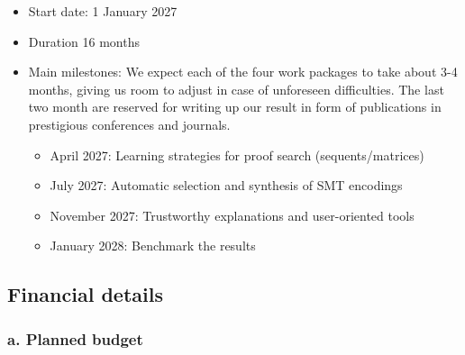 \documentclass[a4paper]{article}
\begin{document}
\begin{itemize}
    \item Start date: 1 January 2027
    \item Duration 16 months
    \item Main milestones: We expect each of the four work packages to take about 3-4 months, giving us room to adjust in case of unforeseen difficulties. The last two month are reserved for writing up our result in form of publications in prestigious conferences and journals.
    \begin{itemize}
        \item  April 2027: Learning strategies for proof search (sequents/matrices)
        \item July 2027: Automatic selection and synthesis of SMT encodings
        \item November 2027: Trustworthy explanations and user-oriented tools
        \item January 2028: Benchmark the results
    \end{itemize}
\end{itemize}


\subsection*{Financial details}

\subsubsection*{a. Planned budget}

\par


\smallskip

\end{document}
